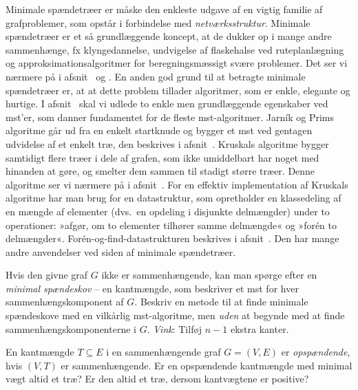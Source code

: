 %
Minimale spændetræer er måske den enkleste udgave af en vigtig familie af grafproblemer, som opstår i forbindelse med \emph{netværksstruktur}.
Minimale spændetræer er et så grundlæggende koncept, at de dukker op i mange andre sammenhænge,
fx klyngedannelse,
undvigelse af flaskehalse ved ruteplanlægning
og approksimationsalgoritmer for beregningsmæssigt svære problemer.
Det ser vi nærmere på i afsnit~ og .
En anden god grund til at betragte  minimale spændetræer er, at at dette problem tillader algoritmer, som er enkle, elegante og hurtige.
I afsnit~ skal vi udlede to enkle men grundlæggende egenskaber ved mst’er, som danner fundamentet for de fleste mst-algoritmer. 
Jarník og Prims algoritme går ud fra en enkelt startknude og bygger et mst ved gentagen udvidelse af et enkelt træ, den beskrives i afsnit~.
Kruskals algoritme bygger samtidigt flere træer i dele af grafen, som ikke umiddelbart har noget med hinanden at gøre, og smelter dem sammen til stadigt større træer.
Denne algoritme ser vi nærmere på  i afsnit~.
For en effektiv implementation af Kruskals algoritme har man brug for en datastruktur, som opretholder en klassedeling af en mængde af elementer (dvs.\ en opdeling i disjunkte delmængder) under to operationer:
»afgør, om to elementer tilhører samme delmængde« og »forén to delmængder«.
Forén-og-find-datastrukturen beskrives i afsnit~.
Den har mange andre anvendelser ved siden af minimale spændetræer.

\begin{exerc}
  Hvis den givne graf $G$ ikke er sammenhængende, kan man spørge efter en 
  \emph{minimal spændeskov} -- en kantmængde, som beskriver et mst for hver sammenhængskomponent af $G$.
  Beskriv en metode til at finde minimale spændeskove med en vilkårlig mst-algoritme, men \emph{uden} at begynde med at finde sammenhængskomponenterne i $G$.
  \emph{Vink}: Tilføj $n-1$ ekstra kanter.
\end{exerc}

\begin{exerc} 
  En kantmængde $T\subseteq E$ i en sammenhængende graf $G=(V,E)$ er \emph{opspændende}, hvis $(V,T)$ er sammenhængende. 
  Er en opspændende kantmængde med minimal vægt altid et træ?
  Er den altid et træ, dersom kantvægtene er positive?
\end{exerc}

